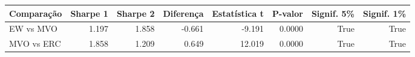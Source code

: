 \begin{tabular}{lrrrrrrr}
\toprule
Comparação & Sharpe 1 & Sharpe 2 & Diferença & Estatística t & P-valor & Signif. 5\% & Signif. 1\% \\
\midrule
EW vs MVO & 1.197 & 1.858 & -0.661 & -9.191 & 0.0000 & True & True \\
MVO vs ERC & 1.858 & 1.209 & 0.649 & 12.019 & 0.0000 & True & True \\
\bottomrule
\end{tabular}